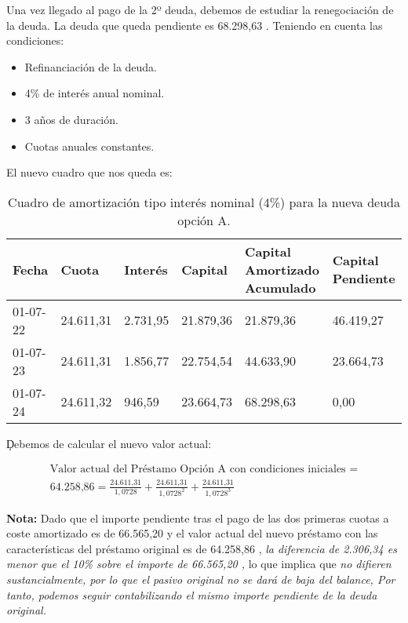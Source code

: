 Una vez llegado al pago de la 2º deuda, debemos de estudiar la renegociación de la deuda. La deuda que queda pendiente es 68.298,63 \e. Teniendo en cuenta las condiciones:
\begin{itemize}
    \item Refinanciación de la deuda.
    \item 4\% de interés anual nominal.
    \item 3 años de duración.
    \item Cuotas anuales constantes.
\end{itemize}

El nuevo cuadro que nos queda es:

\begin{table}[H]
    \centering
    \begin{tabular}{|p{2cm}|p{2cm}|p{2cm}|p{2cm}|p{2cm}|p{2cm}|}
    \hline
    \rowcolor{blue!30}
    \textbf{Fecha} & \textbf{Cuota} & \textbf{Interés} & \textbf{Capital} & \textbf{Capital Amortizado Acumulado} & \textbf{Capital Pendiente} \\
    \hline
    01-07-22 & 24.611,31 & 2.731,95 & 21.879,36 & 21.879,36 & 46.419,27 \\
    \hline
    01-07-23 & 24.611,31 & 1.856,77 & 22.754,54 & 44.633,90 & 23.664,73 \\
    \hline
    01-07-24 & 24.611,32 & 946,59 & 23.664,73 & 68.298,63 & 0,00 \\
    \hline
    \end{tabular}
    \caption{Cuadro de amortización tipo interés nominal (4\%) para la nueva deuda opción A.}
    \label{tabla:Tabla3-Ejercicio7-tema2}
\end{table}

\c{Debemos de calcular el nuevo valor actual:}

\begin{align*}
    \text{Valor actual del Préstamo Opción A con condiciones iniciales } = \\
    \text{64.258,86} = \frac{\text{24.611,31}}{1,0728} + \frac{\text{24.611,31}}{1,0728^2} + \frac{\text{24.611,31}}{1,0728^3}
\end{align*}

\begin{tcolorbox}[colback=blue!5!white,colframe=blue!75!black]
    \textbf{Nota:} Dado que el importe pendiente tras el pago de las dos primeras cuotas a coste amortizado es de 66.565,20 \e y el valor actual del nuevo préstamo con las características del préstamo original es de 64.258,86 \e, \textit{la diferencia de 2.306,34 \e es menor que el 10\% sobre el importe de 66.565,20 \e,} lo que implica que \textit{no difieren sustancialmente, por lo que el pasivo original no se dará de baja del balance, Por tanto, podemos seguir contabilizando el mismo importe pendiente de la deuda original.}
    
\end{tcolorbox}


